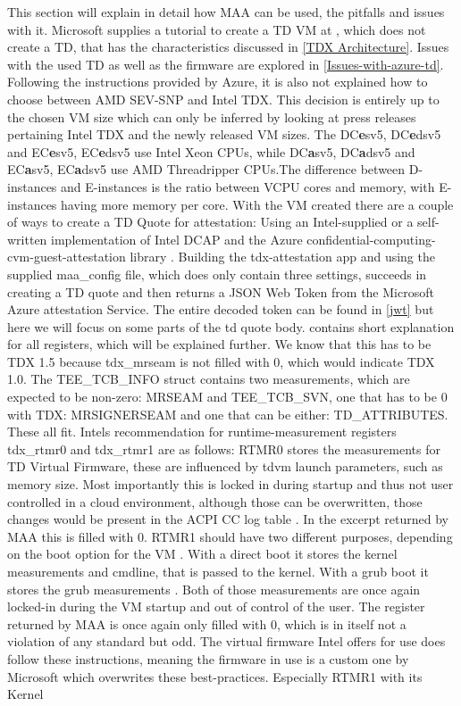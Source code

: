 This section will explain in detail how MAA can be used, the pitfalls and issues with it. Microsoft supplies a tutorial to create a TD VM at  \cite{chasecrum_github_create_2024}, which does not create a TD, that has the characteristics discussed in \cref{TDX Architecture}. Issues with the used TD as well as the firmware are explored in \ref{Issues-with-azure-td}. Following the instructions provided by Azure, it is also not explained how to choose between AMD SEV-SNP and Intel TDX. This decision is entirely up to the chosen VM size which can only be inferred by looking at press releases pertaining Intel TDX and the newly released VM sizes. The DC\textbf{e}sv5, DC\textbf{e}dsv5 and EC\textbf{e}sv5, EC\textbf{e}dsv5 use Intel Xeon CPUs, while DC\textbf{a}sv5, DC\textbf{a}dsv5 and EC\textbf{a}sv5, EC\textbf{a}dsv5 use AMD Threadripper CPUs.The difference between D-instances and E-instances is the ratio between VCPU cores and memory, with E-instances having more memory per core. With the VM created there are a couple of ways to create a TD Quote for attestation: Using an Intel-supplied or a self-written implementation of Intel DCAP and the Azure confidential-computing-cvm-guest-attestation library \cite{microsoft_corporation_azureconfidential-computing-cvm-guest-attestation_nodate}. Building the tdx-attestation app and using the supplied maa\_config file, which does only contain three settings, succeeds in creating a TD quote and then returns a JSON Web Token from the Microsoft Azure attestation Service. The entire decoded token can be found in \ref{jwt} but here we will focus on some parts of the td quote body. \cite{intel_corporation_dcap_2024-1} contains short explanation for all registers, which will be explained further. We know that this has to be TDX 1.5 because tdx\_mrseam is not filled with 0, which would indicate TDX 1.0. The TEE\_TCB\_INFO struct contains two measurements, which are expected to be non-zero: MRSEAM and TEE\_TCB\_SVN, one that has to be 0 with TDX: MRSIGNERSEAM and one that can be either: TD\_ATTRIBUTES. These all fit. Intels recommendation for runtime-measurement registers tdx\_rtmr0 and tdx\_rtmr1 are as follows: RTMR0 stores the measurements for TD Virtual Firmware, these are influenced by tdvm launch parameters, such as memory size. Most importantly this is locked in during startup and thus not user controlled in a cloud environment, although those can be overwritten, those changes would be present in the ACPI CC log table \cite{uefi_forum_inc_acpi_docu_2022}. In the excerpt returned by MAA this is filled with 0. RTMR1 should have two different purposes, depending on the boot option for the VM . With a direct boot it stores the kernel measurements and cmdline, that is passed to the kernel. With a grub boot it stores the grub measurements \cite{intel_corporation_tdx-virtual-firmware-design-guide-rev-004-20231206pdf_2023}.  Both of those measurements are once again locked-in during the VM startup and out of control of the user. The register returned by MAA is once again only filled with 0, which is in itself not a violation of any standard but odd. The virtual firmware Intel offers for use does follow these instructions, meaning the firmware in use is a custom one by Microsoft which overwrites these best-practices. Especially RTMR1 with its Kernel 